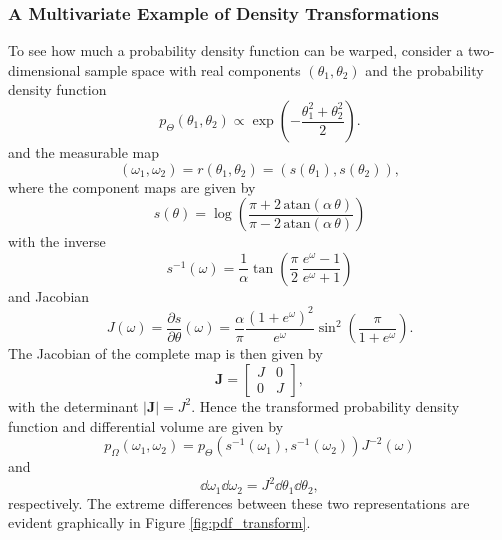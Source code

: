 \subsubsection{A Multivariate Example of Density Transformations}

To see how much a probability density function can be warped, consider 
a two-dimensional sample space with real components 
$\left( \theta_{1}, \theta_{2} \right)$ and the probability density function
%
\begin{equation*}
p_{\Theta} \! \left( \theta_{1}, \theta_{2} \right)
\propto
\exp \! \left( - \frac{\theta_{1}^{2} + \theta_{2}^{2}}{2} \right).
\end{equation*}
%
and the measurable map
%
\begin{equation*}
\left( \omega_{1}, \omega_{2} \right) 
= 
r \! \left( \theta_{1}, \theta_{2} \right) 
= 
\left( s \! \left( \theta_{1} \right), s \! \left( \theta_{2} \right) \right),
\end{equation*}
%
where the component maps are given by
%
\begin{equation*}
s \! \left( \theta \right)
=
\log \! \left(
\frac{ \pi + 2 \, \mathrm{atan} \! \left( \alpha \, \theta \right) }
{ \pi - 2 \, \mathrm{atan} \! \left( \alpha \, \theta \right) }
\right)
\end{equation*}
%
with the inverse
%
\begin{equation*}
s^{-1} \! \left( \omega \right)
=
\frac{1}{\alpha} 
\tan \! \left(
\frac{\pi}{2} \, \frac{e^{\omega} - 1}{e^{\omega} + 1} \right)
\end{equation*}
%
and Jacobian
%
\begin{equation*}
J \! \left( \omega \right)
=
\frac{ \partial s }{ \partial \theta } \! \left( \omega \right)
=
\frac{\alpha}{\pi} \frac{ \left( 1 + e^{\omega} \right)^{2} }{ e^{\omega} }
\sin^{2} \! \left( \frac{ \pi }{ 1 + e^{\omega} } \right).
\end{equation*}
%
The Jacobian of the complete map is then given by
%
\begin{equation*}
\mathbf{J} = 
\begin{bmatrix}
J & 0 \\
0 & J
\end{bmatrix},
\end{equation*}
%
with the determinant $| \mathbf{J} | = J^{2}$.  Hence the transformed
probability density function and differential volume are given by
%
\begin{equation*}
p_{\Omega} \! \left( \omega_{1}, \omega_{2} \right)
=
p_{\Theta} \! \left( 
s^{-1} \! \left( \omega_{1} \right), 
s^{-1} \! \left( \omega_{2} \right) \right)
J^{-2} \! \left( \omega \right)
\end{equation*}
%
and
%
\begin{equation*}
\dd \omega_{1} \dd \omega_{2}
=
J^{2} \dd \theta_{1} \dd \theta_{2},
\end{equation*}
%
respectively.  The extreme differences between these two representations
are evident graphically in Figure \ref{fig:pdf_transform}.

